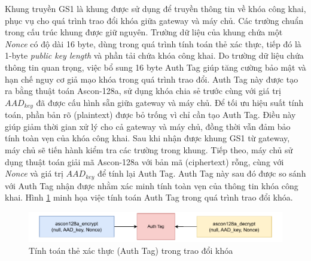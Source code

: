 Khung truyền GS1 là khung được sử dụng để truyền thông tin về khóa công khai, phục vụ cho quá trình trao đổi khóa giữa gateway và máy chủ. Các trường chuẩn trong cấu trúc khung được giữ nguyên. Trường dữ liệu của khung chứa một \textit{Nonce} có độ dài 16 byte, dùng trong quá trình tính toán thẻ xác thực, tiếp đó là 1-byte \textit{public key length} và phần tải chứa khóa công khai. Do trường dữ liệu chứa thông tin quan trọng, việc bổ sung 16 byte Auth Tag giúp tăng cường bảo mật và hạn chế nguy cơ giả mạo khóa trong quá trình trao đổi. Auth Tag này được tạo ra bằng thuật toán Ascon-128a, sử dụng khóa chia sẻ trước cùng với giá trị $AAD_{key}$ đã được cấu hình sẵn giữa gateway và máy chủ. Để tối ưu hiệu suất tính toán, phần bản rõ (plaintext) được bỏ trống vì chỉ cần tạo Auth Tag. Điều này giúp giảm thời gian xử lý cho cả gateway và máy chủ, đồng thời vẫn đảm bảo tính toàn vẹn của khóa công khai. Sau khi nhận được khung GS1 từ gateway, máy chủ sẽ tiến hành kiểm tra các trường trong khung. Tiếp theo, máy chủ sử dụng thuật toán giải mã Ascon-128a với bản mã (ciphertext) rỗng, cùng với \textit{Nonce} và giá trị $AAD_{key}$ để tính lại Auth Tag. Auth Tag này sau đó được so sánh với Auth Tag nhận được nhằm xác minh tính toàn vẹn của thông tin khóa công khai. Hình \ref{fig:auth_t} minh họa việc tính toán Auth Tag trong quá trình trao đổi khóa.

\begin{figure}[h]
    \centering
    \includegraphics[width=0.85\linewidth]{auth_t.pdf}
    \caption{Tính toán thẻ xác thực (Auth Tag) trong trao đổi khóa}
    \label{fig:auth_t}
\end{figure}

